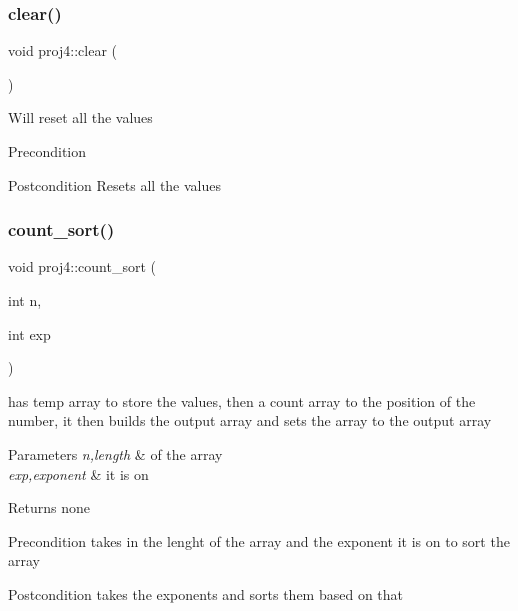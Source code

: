 \subsubsection{\texorpdfstring{clear()}{clear()}}
{\footnotesize\ttfamily void proj4\+::clear (\begin{DoxyParamCaption}{ }\end{DoxyParamCaption})}

Will reset all the values \begin{DoxyPrecond}{Precondition}

\end{DoxyPrecond}
\begin{DoxyPostcond}{Postcondition}
Resets all the values 
\end{DoxyPostcond}
\mbox{\label{classproj4_a409353e4232f280b43a76e3bd9276cff}} 
\subsubsection{\texorpdfstring{count\+\_\+sort()}{count\_sort()}}
{\footnotesize\ttfamily void proj4\+::count\+\_\+sort (\begin{DoxyParamCaption}\item[{int}]{n,  }\item[{int}]{exp }\end{DoxyParamCaption})}



has temp array to store the values, then a count array to the position of the number, it then builds the output array and sets the array to the output array 


\begin{DoxyParams}{Parameters}
{\em n,length} & of the array \\
\hline
{\em exp,exponent} & it is on \\
\hline
\end{DoxyParams}
\begin{DoxyReturn}{Returns}
none 
\end{DoxyReturn}
\begin{DoxyPrecond}{Precondition}
takes in the lenght of the array and the exponent it is on to sort the array 
\end{DoxyPrecond}
\begin{DoxyPostcond}{Postcondition}
takes the exponents and sorts them based on that 
\end{DoxyPostcond}
\mbox{\label{classproj4_a0f93bf202146d4965668daaf5ffc1b1b}} 
